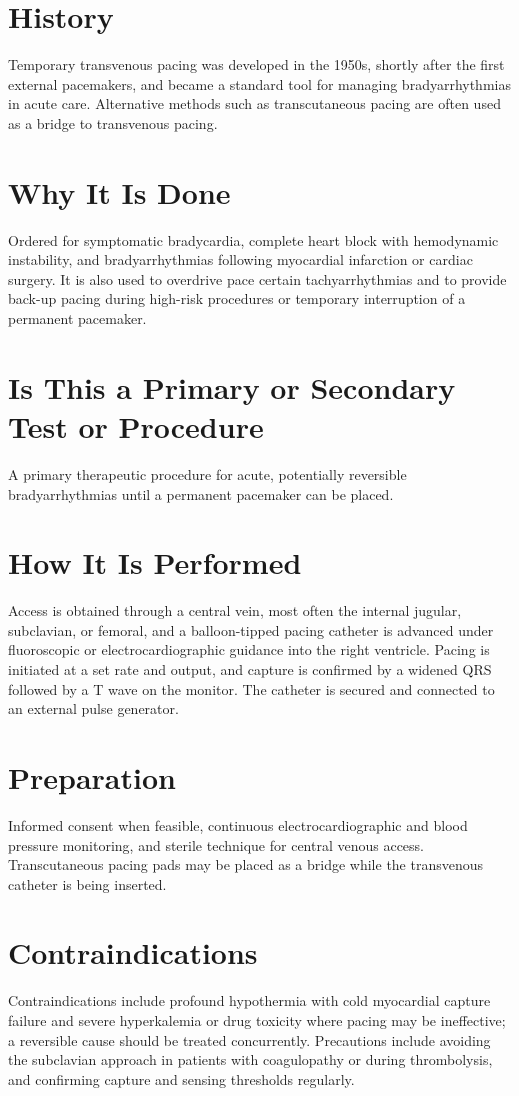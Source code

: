 \section*{History}
Temporary transvenous pacing was developed in the 1950s, shortly after the first external pacemakers, and became a standard tool for managing bradyarrhythmias in acute care. Alternative methods such as transcutaneous pacing are often used as a bridge to transvenous pacing.

\section*{Why It Is Done}
Ordered for symptomatic bradycardia, complete heart block with hemodynamic instability, and bradyarrhythmias following myocardial infarction or cardiac surgery. It is also used to overdrive pace certain tachyarrhythmias and to provide back-up pacing during high-risk procedures or temporary interruption of a permanent pacemaker.

\section*{Is This a Primary or Secondary Test or Procedure}
A primary therapeutic procedure for acute, potentially reversible bradyarrhythmias until a permanent pacemaker can be placed.

\section*{How It Is Performed}
Access is obtained through a central vein, most often the internal jugular, subclavian, or femoral, and a balloon-tipped pacing catheter is advanced under fluoroscopic or electrocardiographic guidance into the right ventricle. Pacing is initiated at a set rate and output, and capture is confirmed by a widened QRS followed by a T wave on the monitor. The catheter is secured and connected to an external pulse generator.

\section*{Preparation}
Informed consent when feasible, continuous electrocardiographic and blood pressure monitoring, and sterile technique for central venous access. Transcutaneous pacing pads may be placed as a bridge while the transvenous catheter is being inserted.

\section*{Contraindications}
Contraindications include profound hypothermia with cold myocardial capture failure and severe hyperkalemia or drug toxicity where pacing may be ineffective; a reversible cause should be treated concurrently. Precautions include avoiding the subclavian approach in patients with coagulopathy or during thrombolysis, and confirming capture and sensing thresholds regularly.

